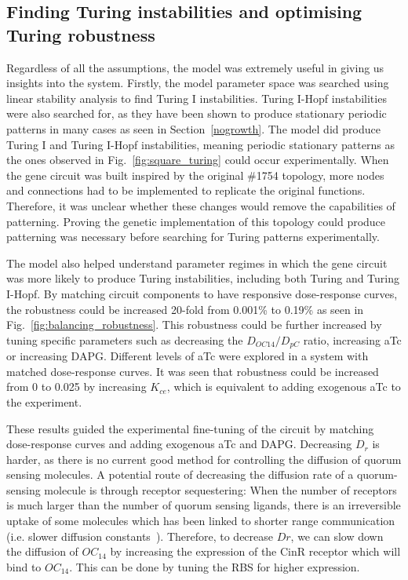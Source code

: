 \subsection{Finding Turing instabilities and optimising Turing robustness}
Regardless of all the assumptions, the model was extremely useful in giving us insights into the system.
Firstly, the model parameter space was searched using linear stability analysis to find Turing I instabilities.
Turing I-Hopf instabilities were also searched for, as they have been shown to produce stationary periodic patterns in many cases as seen in Section~\ref{nogrowth}.
The model did produce Turing I and Turing I-Hopf instabilities, meaning periodic stationary patterns as the ones observed in Fig.~\ref{fig:square_turing} could occur experimentally.
When the gene circuit was built inspired by the original \#1754 topology,
more nodes and connections had to be implemented to replicate the original functions.
Therefore, it was unclear whether these changes would remove the capabilities of patterning.
Proving the genetic implementation of this topology could produce patterning was necessary before searching for Turing patterns experimentally.

The model also helped understand parameter regimes in which the gene circuit was more likely to produce Turing instabilities, including both Turing and Turing I-Hopf.
By matching circuit components to have responsive dose-response curves, the robustness could be increased 20-fold from 0.001\% to 0.19\% as seen in Fig.~\ref{fig:balancing_robustness}.
This robustness could be further increased by tuning specific parameters such as decreasing the $D_{OC14}/D_{pC}$ ratio, increasing aTc or increasing DAPG.
Different levels of aTc were explored in a system with matched dose-response curves.
It was seen that robustness could be increased from 0 to 0.025 by increasing $K_{ce}$, which is equivalent to adding exogenous aTc to the experiment.

These results guided the experimental fine-tuning of the circuit by matching dose-response curves and adding exogenous aTc and DAPG.
Decreasing $D_{r}$ is harder, as there is no current good method for controlling the diffusion of quorum sensing molecules.
A potential route of decreasing the diffusion rate of a quorum-sensing molecule is through receptor sequestering:
When the number of receptors is much larger than the number of quorum sensing ligands,
there is an irreversible uptake of some molecules which has been linked to shorter range communication (i.e. slower diffusion constants~\parencite{vangestel}).
Therefore, to decrease $D{r}$,
we can slow down the diffusion of $OC_{14}$ by increasing the expression of the CinR receptor which will bind to $OC_{14}$.
This can be done by tuning the RBS for higher expression.

